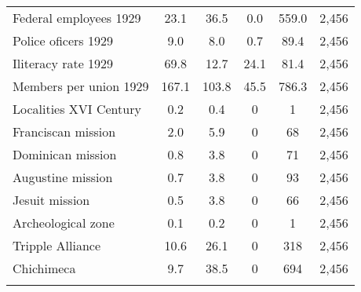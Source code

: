 \begin{table}[!htbp]
\begin{tabular}{@{\extracolsep{5pt}}lccccc}
Federal employees 1929 & 23.1 & 36.5 & 0.0 & 559.0 & 2,456 \\ 
Police oficers 1929 & 9.0 & 8.0 & 0.7 & 89.4 & 2,456 \\ 
Iliteracy rate 1929 & 69.8 & 12.7 & 24.1 & 81.4 & 2,456 \\ 
Members per union 1929 & 167.1 & 103.8 & 45.5 & 786.3 & 2,456 \\ 
Localities XVI Century & 0.2 & 0.4 & 0 & 1 & 2,456 \\ 
Franciscan mission & 2.0 & 5.9 & 0 & 68 & 2,456 \\ 
Dominican mission & 0.8 & 3.8 & 0 & 71 & 2,456 \\ 
Augustine mission & 0.7 & 3.8 & 0 & 93 & 2,456 \\ 
Jesuit mission & 0.5 & 3.8 & 0 & 66 & 2,456 \\ 
Archeological zone & 0.1 & 0.2 & 0 & 1 & 2,456 \\ 
Tripple Alliance & 10.6 & 26.1 & 0 & 318 & 2,456 \\ 
Chichimeca & 9.7 & 38.5 & 0 & 694 & 2,456 \\ 
\hline \\[-1.8ex] 
\end{tabular} 
\end{table} 
